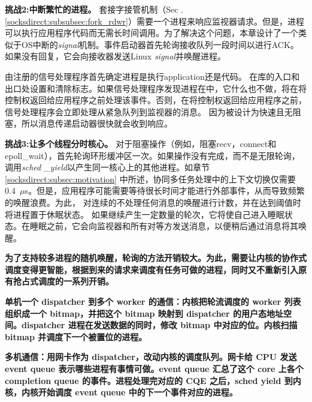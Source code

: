 \textbf {挑战2:中断繁忙的进程。}
套接字接管机制（Sec .~ \ref {socksdirect:subsubsec:fork_rdwr}）需要一个进程来响应监视器请求。但是，进程可以执行应用程序代码而无需长时间调用\libipc {}。为了解决这个问题，本章设计了一个类似于OS中断的\textit {signal}机制。事件启动器首先轮询接收队列一段时间以进行ACK。如果没有回复，它会向接收器发送Linux \textit {signal}并唤醒进程。

由\libipc {}注册的信号处理程序首先确定进程是执行application还是\libipc {}代码。 \libipc {}在库的入口和出口处设置和清除标志。如果信号处理程序发现进程在\libipc 中，它什么也不做，\libipc {}将在将控制权返回给应用程序之前处理该事件。否则，在将控制权返回给应用程序之前，信号处理程序会立即处理从紧急队列到监视器的消息。
因为\libipc {}被设计为快速且无阻塞，所以消息传递启动器很快就会收到响应。

\textbf {挑战3:让多个线程分时核心。}
对于阻塞操作（例如，阻塞recv，connect和epoll\_wait），\libipc {}首先轮询环形缓冲区一次。如果操作没有完成，而不是无限轮询，\libipc {}调用\textit {sched \_yield}以产生同一核心上的其他进程。如章节 \ref {socksdirect:subsec:motivation} 中所述，协同多任务处理中的上下文切换仅需要0.4~$\mu$s。但是，应用程序可能需要等待很长时间才能进行外部事件，从而导致频繁的唤醒浪费。为此，\libipc{} 对连续的不处理任何消息的唤醒进行计数，并在达到阈值时将进程置于休眠状态。
如果\libipc {}继续产生一定数量的轮次，它将使自己进入睡眠状态。在睡眠之前，它会向监视器和所有对等方发送消息，以便稍后通过消息将其唤醒。

\textbf{为了支持较多进程的随机唤醒，轮询的方法开销较大。为此，需要让内核的协作式调度变得更智能，根据到来的请求来调度有任务可做的进程，同时又不重新引入原有抢占式调度的一系列开销。}

\textbf{单机一个 dispatcher 到多个 worker 的通信：内核把轮流调度的 worker 列表组织成一个 bitmap，并把这个 bitmap 映射到 dispatcher 的用户态地址空间。dispatcher 进程在发送数据的同时，修改 bitmap 中对应的位。内核扫描 bitmap 并调度下一个被置位的进程。}

\textbf{多机通信：用网卡作为 dispatcher，改动内核的调度队列。网卡给 CPU 发送 event queue 表示哪些进程有事情可做。event queue 汇总了这个 core 上各个 completion queue 的事件。进程处理完对应的 CQE 之后，sched yield 到内核，内核开始调度 event queue 中的下一个事件对应的进程。}


